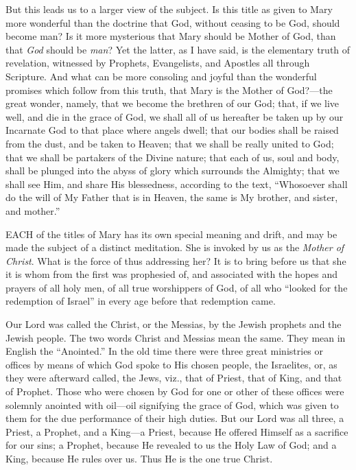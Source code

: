 But this leads us to a larger
view of the subject. Is this title as given to Mary more wonderful than
the doctrine that God, without ceasing to be God, should become man? Is
it more mysterious that Mary should be Mother of God, than that \emph{God}
should be \emph{man}? Yet the latter, as I have said, is the elementary
truth of revelation, witnessed by Prophets, Evangelists, and Apostles
all through Scripture. And what can be more consoling and joyful than
the wonderful promises which follow from this truth, that Mary is the
Mother of God?—the great wonder, namely, that we become the brethren
of our God; that, if we live well, and die in the grace of God, we shall
all of us hereafter be taken up by our Incarnate God to that place where
angels dwell; that our bodies shall be raised from the dust, and be
taken to Heaven; that we shall be really united to God; that we shall be
partakers of the Divine nature; that each of us, soul and body, shall be
plunged into the abyss of glory which surrounds the Almighty; that
we shall see Him, and share His blessedness, according to the text, ``Whosoever
shall do the will of My Father that is in Heaven, the same is My
brother, and sister, and mother.''



EACH
of the titles of Mary has its own special meaning and drift, and may be
made the subject of a distinct meditation. She is invoked by us as the \emph{Mother
of Christ}. What is the force of thus addressing her? It is to bring
before us that she it is whom from the first was prophesied of, and
associated with the hopes and prayers of all holy men, of all true
worshippers of God, of all who ``looked for the redemption of Israel'' in
every age before that redemption came.

Our Lord was called the Christ,
or the Messias, by the Jewish prophets and the Jewish people. The two
words Christ and Messias mean the same. They mean in English the ``Anointed.''
In the old time there were three great ministries or offices by means of
which God spoke to His chosen people, the Israelites, or, as they were
afterward called, the Jews, viz., that of Priest, that of King, and that
of Prophet. Those who were chosen by God for one or other of these
offices were solemnly anointed with oil—oil signifying the grace of
God, which was given to them for the due performance of their high
duties. But our Lord was all three, a Priest, a Prophet, and a King—a
Priest, because He offered Himself as a sacrifice for our sins; a
Prophet, because He revealed to us the Holy Law of God; and a King,
because He rules over us. Thus He is the one true Christ.

